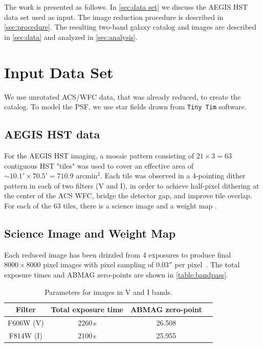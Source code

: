 \documentclass[a4paper,11pt]{article}
\begin{document}
The work is presented as follows. In \autoref{sec:data set} we discuss the AEGIS HST data set used as input. The image reduction procedure is described in \autoref{sec:procedure}. The resulting two-band galaxy catalog and images are described in \autoref{sec:data} and analyzed in \autoref{sec:analysis}. 

\section{Input Data Set}
We use unrotated ACS/WFC data, that was already reduced, to create the catalog. To model the PSF, we use star fields drawn from {\tt Tiny Tim} software.  
\label{sec:data set}
\subsection{AEGIS HST data}
For the AEGIS HST imaging, a mosaic pattern consisting of $21 \times 3 = 63$ contiguous HST "tiles" was used to cover an effective area of $∼10.1'\times 70.5' = 710.9$ arcmin$^2$. Each tile was observed in a 4-pointing dither pattern in each of two filters (V and I), in order to achieve half-pixel dithering at the center of the ACS WFC, bridge the detector gap, and improve tile overlap. For each of the 63 tiles, there is a science image and a weight map \citep{Davis2006}.

\subsection{Science Image and Weight Map}
Each reduced image has been drizzled from 4 exposures to produce final $8000 \times 8000$ pixel images with pixel sampling of $0.03''$ per pixel~\citep{Lotz2008}. The total exposure times and ABMAG zero-points  are shown in \autoref{table:bandpass}.

\begin{table}[htb]
\centering
\caption{Parameters for images in V and I bands.}
\label{table:bandpass}
\begin{tabular}{cccc}
\hline
\hline
Filter & Total exposure time & ABMAG zero-point  \\
\hline
 F606W (V)  &  2260\,s  & 26.508  \\
 F814W (I)  &  2100\,s  & 25.955  \\
\end{tabular}
\end{table}
\end{document}

